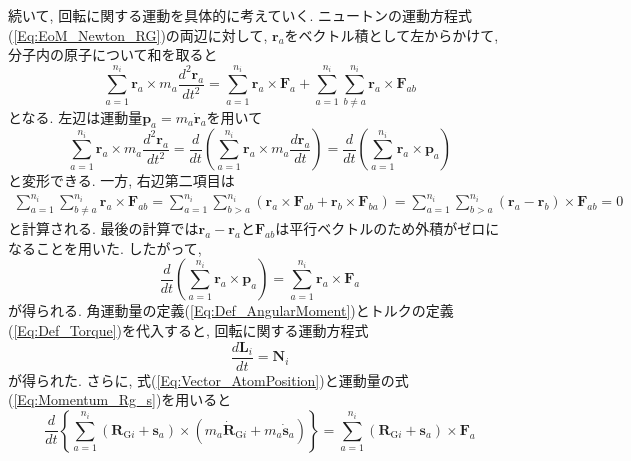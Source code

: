 続いて, 回転に関する運動を具体的に考えていく.
ニュートンの運動方程式(\ref{Eq:EoM_Newton_RG})の両辺に対して, $\bm{r}_{a}$をベクトル積として左からかけて, 分子内の原子について和を取ると
\begin{equation}
  \sum_{a=1}^{n_{i}} \bm{r}_{a} \times m_{a} \frac{d^{2} \bm{r}_{a}}{dt^{2}}
  =
  \sum_{a=1}^{n_{i}} \bm{r}_{a} \times \bm{F}_{a}
  +
  \sum_{a=1}^{n_{i}} \sum_{b \neq a}^{n_{i}} \bm{r}_{a} \times \bm{F}_{ab}
\end{equation}
となる. 左辺は運動量$\bm{p}_{a} = m_{a} \dot{\bm{r}}_{a}$を用いて
\begin{equation}
  \sum_{a=1}^{n_{i}} \bm{r}_{a} \times m_{a} \frac{d^{2} \bm{r}_{a}}{dt^{2}}
  =
  \frac{d}{dt}
  \left(
    \sum_{a=1}^{n_{i}} \bm{r}_{a} \times m_{a} \frac{d \bm{r}_{a}}{dt}
  \right)
  =
  \frac{d}{dt}
  \left(
    \sum_{a=1}^{n_{i}} \bm{r}_{a} \times \bm{p}_{a}
  \right)
\end{equation}
と変形できる. 一方, 右辺第二項目は
\begin{align}
  \sum_{a=1}^{n_{i}} \sum_{b \neq a}^{n_{i}} \bm{r}_{a} \times \bm{F}_{ab}
  =
  \sum_{a=1}^{n_{i}} \sum_{b > a}^{n_{i}}
  \left(
    \bm{r}_{a} \times \bm{F}_{ab}
    +
    \bm{r}_{b} \times \bm{F}_{ba}
  \right)
  =
  \sum_{a=1}^{n_{i}} \sum_{b > a}^{n_{i}}
  \left(
    \bm{r}_{a} - \bm{r}_{b}
  \right)
  \times \bm{F}_{ab}
  =0
\end{align}
と計算される. 最後の計算では$\bm{r}_{a} - \bm{r}_{a}$と$\bm{F}_{ab}$は平行ベクトルのため外積がゼロになることを用いた. したがって, 
\begin{equation}
  \frac{d}{dt}
  \left(
    \sum_{a=1}^{n_{i}} \bm{r}_{a} \times \bm{p}_{a}
  \right)
  =
  \sum_{a=1}^{n_{i}} \bm{r}_{a} \times \bm{F}_{a}
\end{equation}
が得られる. 角運動量の定義(\ref{Eq:Def_AngularMoment})とトルクの定義(\ref{Eq:Def_Torque})を代入すると, 回転に関する運動方程式
\begin{equation}
  \frac{d \bm{L}_{i}}{dt} = \bm{N}_{i}
  \label{Eq:EoM_AngularMoment_Torque1}
\end{equation}
が得られた.
さらに, 式(\ref{Eq:Vector_AtomPosition})と運動量の式(\ref{Eq:Momentum_Rg_s})を用いると
\begin{equation}
  \frac{d}{dt}
  \left\{
    \sum_{a=1}^{n_{i}}
    \left(\bm{R}_{\mathrm{G}i} + \bm{s}_{a}\right)
    \times
    \left(m_{a} \dot{\bm{R}}_{\mathrm{G}i} + m_{a}\dot{\bm{s}}_{a}\right)
  \right\}
  =
  \sum_{a=1}^{n_{i}}
  \left(\bm{R}_{\mathrm{G}i} + \bm{s}_{a}\right)
  \times
  \bm{F}_{a}
\end{equation}
